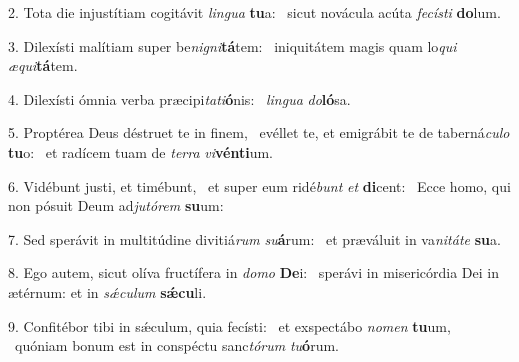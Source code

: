 2. Tota die injustítiam cogitávit \textit{lin}\textit{gua} \textbf{tu}a: \ast\  sicut novácula acúta \textit{fe}\textit{cís}\textit{ti} \textbf{do}lum.\

3. Dilexísti malítiam super be\textit{ni}\textit{gni}\textbf{tá}tem: \ast\  iniquitátem magis quam lo\textit{qui} \textit{æ}\textit{qui}\textbf{tá}tem.\

4. Dilexísti ómnia verba præcipi\textit{ta}\textit{ti}\textbf{ó}nis: \ast\  \textit{lin}\textit{gua} \textit{do}\textbf{ló}sa.\

5. Proptérea Deus déstruet te in finem, \dag\  evéllet te, et emigrábit te de taberná\textit{cu}\textit{lo} \textbf{tu}o: \ast\  et radícem tuam de \textit{ter}\textit{ra} \textit{vi}\textbf{vén}\textbf{ti}um.\

6. Vidébunt justi, et timébunt, \dag\  et super eum ridé\textit{bunt} \textit{et} \textbf{di}cent: \ast\  Ecce homo, qui non pósuit Deum ad\textit{ju}\textit{tó}\textit{rem} \textbf{su}um:\

7. Sed sperávit in multitúdine divitiá\textit{rum} \textit{su}\textbf{á}rum: \ast\  et præváluit in va\textit{ni}\textit{tá}\textit{te} \textbf{su}a.\

8. Ego autem, sicut olíva fructífera in \textit{do}\textit{mo} \textbf{De}i: \ast\  sperávi in misericórdia Dei in ætérnum: et in \textit{sǽ}\textit{cu}\textit{lum} \textbf{sǽ}\textbf{cu}li.\

9. Confitébor tibi in sǽculum, quia fecísti: \dag\  et exspectábo \textit{no}\textit{men} \textbf{tu}um, \ast\  quóniam bonum est in conspéctu sanc\textit{tó}\textit{rum} \textit{tu}\textbf{ó}rum.\

